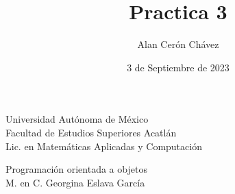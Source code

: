 \documentclass[12pt]{article}
\author{Alan Cerón Chávez}
\title{Practica 3}
\date{3 de Septiembre de 2023}
\begin{document}
\maketitle
\thispagestyle{empty}

\begin{center}
    \LARGE{Universidad Autónoma de México}\\\medskip
    \Large{Facultad de Estudios Superiores Acatlán}\\
    \Large{Lic. en Matemáticas Aplicadas y Computación}\\\medskip

    \large{Programación orientada a objetos}\\
    \large{M. en C. Georgina Eslava García}\\\medskip
\end{center}
\end{document}
